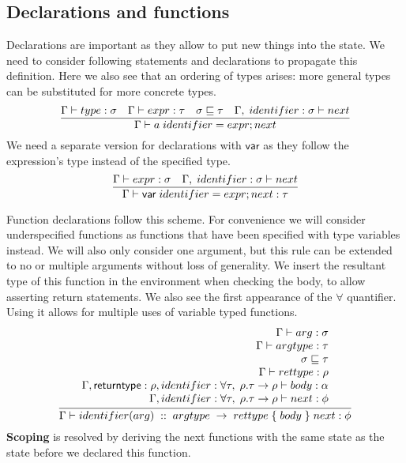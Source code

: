 \subsection{Declarations and functions}\label{sec:declarations}

Declarations are important as they allow to put new things into the state.
We need to consider following statements and declarations to propagate this definition.
Here we also see that an ordering of types arises: more general types can be substituted for more concrete types.
\[
    \infer{\Gamma \vdash a \; identifier = expr;next}{
        \Gamma \vdash type : \sigma &
        \Gamma \vdash expr : \tau &
        \sigma \sqsubseteq \tau &
        \Gamma,\; identifier : \sigma \vdash next
    }
\]
We need a separate version for declarations with $\mathsf{var}$ as they follow the expression's type instead of the specified type.
\[
    \infer{\Gamma \vdash \mathsf{var} \; identifier = expr;next : \tau}{
        \Gamma \vdash expr : \sigma &
        \Gamma,\; identifier : \sigma \vdash next
    }
\]

Function declarations follow this scheme. For convenience we will consider underspecified functions as functions that have been specified with type variables instead. We will also only consider one argument, but this rule can be extended to no or multiple arguments without loss of generality. We insert the resultant type of this function in the environment when checking the body, to allow asserting return statements.
We also see the first appearance of the $\forall$ quantifier.
Using it allows for multiple uses of variable typed functions.
\[
    \infer{\Gamma \vdash identifier(arg)\; ::\; argtype\; \to\; rettype\; \{\; body\; \}\; next : \phi}{
        \begin{array}{r}
            \Gamma \vdash arg : \sigma \\
            \Gamma \vdash argtype : \tau\\
            \sigma \sqsubseteq \tau \\
            \Gamma \vdash rettype : \rho \\
            \Gamma, \mathsf{returntype} : \rho, identifier :\forall \tau,\;\rho. \tau \to \rho\vdash body : \alpha \\
            \Gamma, identifier :\forall \tau,\;\rho. \tau \to \rho \vdash next : \phi
        \end{array}
    }
\]
\textbf{Scoping} is resolved by deriving the next functions with the same state as the state before we declared this function.

